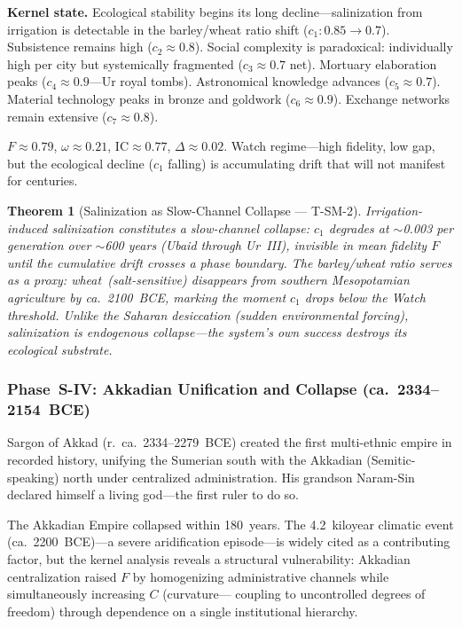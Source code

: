 \documentclass[
  aps,
  prd,
  twocolumn,
  superscriptaddress,
  nofootinbib,
  floatfix
]{revtex4-2}
\newtheorem{theorem}{Theorem}
\newcommand{\IC}{\mathrm{IC}}
\begin{document}
\textbf{Kernel state.}  Ecological stability begins
its long decline---salinization from irrigation is
detectable in the barley/wheat ratio shift
($c_1: 0.85 \to 0.7$).  Subsistence remains high
($c_2 \approx 0.8$).  Social complexity is paradoxical:
individually high per city but systemically fragmented
($c_3 \approx 0.7$ net).  Mortuary elaboration peaks
($c_4 \approx 0.9$---Ur royal tombs).  Astronomical
knowledge advances ($c_5 \approx 0.7$).  Material
technology peaks in bronze and goldwork ($c_6 \approx
0.9$).  Exchange networks remain extensive ($c_7
\approx 0.8$).

$F \approx 0.79$, $\omega \approx 0.21$,
$\IC \approx 0.77$, $\Delta \approx 0.02$.
Watch regime---high fidelity, low gap, but the
ecological decline ($c_1$ falling) is accumulating
drift that will not manifest for centuries.

\begin{theorem}[Salinization as Slow-Channel
Collapse --- T-SM-2]\label{thm:salinization}
Irrigation-induced salinization constitutes a
slow-channel collapse: $c_1$ degrades at
$\sim$0.003 per generation over $\sim$600 years
(Ubaid through Ur~III), invisible in mean fidelity $F$
until the cumulative drift crosses a phase boundary.
The barley/wheat ratio serves as a proxy:
wheat~(salt-sensitive) disappears from southern
Mesopotamian agriculture by ca.\ 2100~BCE, marking
the moment $c_1$ drops below the Watch threshold.
Unlike the Saharan desiccation (sudden environmental
forcing), salinization is \emph{endogenous}
collapse---the system's own success destroys its
ecological substrate.
\end{theorem}


\subsubsection{Phase~S-IV: Akkadian Unification and
Collapse (ca.\ 2334--2154~BCE)}\label{sec:akkad}

Sargon of Akkad (r.\ ca.\ 2334--2279~BCE) created the
first multi-ethnic empire in recorded history,
unifying the Sumerian south with the Akkadian
(Semitic-speaking) north under centralized
administration.  His grandson Naram-Sin declared
himself a living god---the first ruler to do so.

The Akkadian Empire collapsed within 180~years.
The 4.2~kiloyear climatic event (ca.\ 2200~BCE)---a
severe aridification episode---is widely cited as a
contributing factor, but the kernel analysis reveals a
structural vulnerability: Akkadian centralization
raised $F$ by homogenizing administrative channels
while simultaneously increasing $C$ (curvature---
coupling to uncontrolled degrees of freedom) through
dependence on a single institutional hierarchy.
\end{document}
